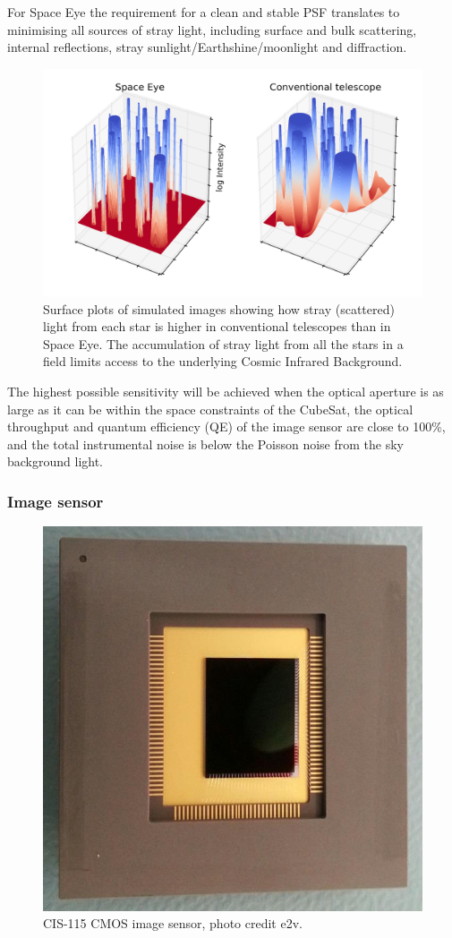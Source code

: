 \documentclass[]{iac}
\begin{document}
For Space Eye the requirement for a clean and stable PSF translates to minimising all sources of stray light, including
surface and bulk scattering, internal reflections, stray sunlight/Earthshine/moonlight and diffraction.

\begin{figure}[htp]
  \includegraphics[width=\columnwidth]{figures/wings.png}
  \caption{\label{fig:wings}Surface plots of simulated images showing how stray (scattered) light from each star is
    higher in conventional telescopes than in Space Eye. The accumulation of stray light from all the stars in a field
    limits access to the underlying Cosmic Infrared Background.}
\end{figure}

The highest possible sensitivity will be achieved when the optical aperture is as large as it can be within the space
constraints of the CubeSat, the optical throughput and quantum efficiency (QE) of the image sensor are close to 100\%,
and the total instrumental noise is below the Poisson noise from the sky background light.

\subsubsection{Image sensor}

\begin{figure}[htp]
  \center \includegraphics[width=0.7\columnwidth]{figures/cis115.png}
  \caption{\label{fig:cis115}CIS-115 CMOS image sensor, photo credit e2v.}
\end{figure}
\end{document}
